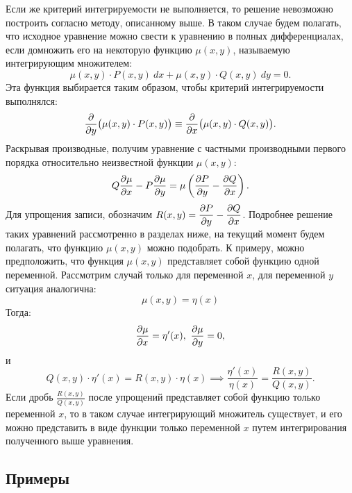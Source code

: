 	Если же критерий интегрируемости не выполняется, то решение невозможно построить согласно методу, описанному выше. В таком случае будем полагать, что исходное уравнение можно свести к уравнению в полных дифференциалах, если домножить его на некоторую функцию $\mu(x, y)$, называемую интегрирующим множителем:
	\[ \mu(x, y) \cdot P(x, y) ~ dx + \mu(x, y) \cdot Q(x, y) ~ dy = 0. \]
	Эта функция выбирается таким образом, чтобы критерий интегрируемости выполнялся:
	\[ \dfrac{\partial }{\partial y} \bigl( \mu(x, y) \cdot P(x, y) \bigr) \equiv \dfrac{\partial }{\partial x} \bigl( \mu(x, y) \cdot Q(x, y) \bigr). \]
	Раскрывая производные, получим уравнение с частными производными первого порядка относительно неизвестной функции $ \mu(x, y) $:
	\[ Q\dfrac{\partial \mu}{\partial x} - P\dfrac{\partial \mu}{\partial y} = \mu \left( \dfrac{\partial P}{\partial y} - \dfrac{\partial Q}{\partial x} \right). \]
	Для упрощения записи, обозначим $R(x, y) = \dfrac{\partial P}{\partial y} - \dfrac{\partial Q}{\partial x}$. Подробнее решение таких уравнений рассмотренно в разделах ниже, на текущий момент будем полагать, что функцию $\mu(x, y)$ можно подобрать. К примеру, можно предположить, что функция $\mu(x, y)$ представляет собой функцию одной переменной. Рассмотрим случай только для переменной $x$, для переменной $y$ ситуация аналогична:
	\[ \mu(x, y) = \eta(x) \]
	Тогда:
	\[ \dfrac{\partial \mu}{\partial x} = \eta'(x), ~ \dfrac{\partial \mu}{\partial y} = 0, \]
	и
	\[ Q(x, y) \cdot \eta'(x) = R(x, y) \cdot \eta(x) \implies \frac{\eta'(x)}{\eta(x)} = \frac{R(x, y)}{Q(x, y)}. \]
	Если дробь $\frac{R(x, y)}{Q(x, y)}$ после упрощений представляет собой функцию только переменной $x$, то в таком случае интегрирующий множитель существует, и его можно представить в виде функции только переменной $x$ путем интегрирования полученного выше уравнения.

	\subsection{Примеры}

